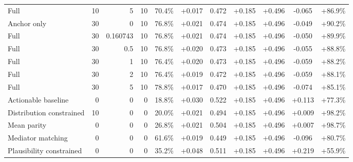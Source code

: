 \begin{table}[htbp]
\begin{tabular}{lrrrccccccc}
Full & 10 & 5 & 10 & 70.4\% & +0.017 & 0.472 & +0.185 & +0.496 & -0.065 & +86.9\% \\
Anchor only & 30 & 0 & 10 & 76.8\% & +0.021 & 0.474 & +0.185 & +0.496 & -0.049 & +90.2\% \\
Full & 30 & 0.160743 & 10 & 76.8\% & +0.021 & 0.474 & +0.185 & +0.496 & -0.050 & +89.9\% \\
Full & 30 & 0.5 & 10 & 76.8\% & +0.020 & 0.473 & +0.185 & +0.496 & -0.055 & +88.8\% \\
Full & 30 & 1 & 10 & 76.4\% & +0.020 & 0.473 & +0.185 & +0.496 & -0.059 & +88.2\% \\
Full & 30 & 2 & 10 & 76.4\% & +0.019 & 0.472 & +0.185 & +0.496 & -0.059 & +88.1\% \\
Full & 30 & 5 & 10 & 78.8\% & +0.017 & 0.470 & +0.185 & +0.496 & -0.074 & +85.1\% \\
Actionable baseline & 0 & 0 & 0 & 18.8\% & +0.030 & 0.522 & +0.185 & +0.496 & +0.113 & +77.3\% \\
Distribution constrained & 10 & 0 & 0 & 20.0\% & +0.021 & 0.494 & +0.185 & +0.496 & +0.009 & +98.2\% \\
Mean parity & 0 & 0 & 0 & 26.8\% & +0.021 & 0.504 & +0.185 & +0.496 & +0.007 & +98.7\% \\
Mediator matching & 0 & 0 & 0 & 61.6\% & +0.019 & 0.449 & +0.185 & +0.496 & -0.096 & +80.7\% \\
Plausibility constrained & 0 & 0 & 0 & 35.2\% & +0.048 & 0.511 & +0.185 & +0.496 & +0.219 & +55.9\% \\
\bottomrule
\end{tabular}
\end{table}